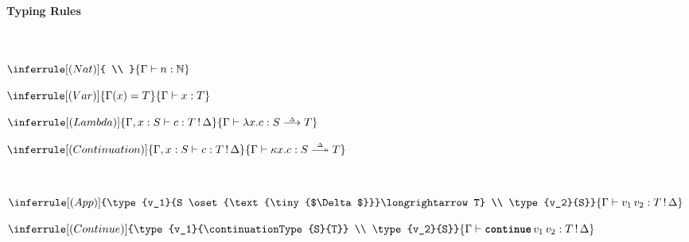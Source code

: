 \begin{figure}
  \begin{eff-desc}
    {\large\textbf{Typing Rules}}\\
    \vspace{2mm}\\
    \\
    \begin{center}
    \begin{minipage}[t]{0.2\textwidth}
      \centering
      $\inferrule[(Nat)]
      { \\ }
      {\type{n}{\mathbb{N}}}$
      \end{minipage}%
  \begin{minipage}[t]{0.2\textwidth}
    \centering
  $\inferrule[(Var)]
  {\Gamma(x) = T}
  {\type{x}{T}}$
  \end{minipage}%
  \begin{minipage}[t]{0.3\textwidth}
    \centering
  $\inferrule[(Lambda)]
    {\type[, x:S]{c}{\effectType{T}}}
    {\type{\function{x}{c}}{\functionType{S}{T}}}$
  \end{minipage}%
  \begin{minipage}[t]{0.3\textwidth}
  \centering
$\inferrule[(Continuation)]
  {\type[, x:S]{c}{\effectType{T}}}
  {\type{\continuation{x}{c}}{\continuationType{S}{T}}}$
\end{minipage}  
  \vspace{5mm}

\end{center}
  
  \\
  \begin{center}
    
  \begin{minipage}[t]{0.5\textwidth}
    \centering
  $\inferrule[(App)]
    {\type{v_1}{S \oset{\text{\tiny{$\Delta$}}}\longrightarrow T} \\ \type{v_2}{S}}
    {\type{v_1 \, v_2}{\effectType{T}}}$
  \end{minipage}%
  \begin{minipage}[t]{0.5\textwidth}
    \centering
  $\inferrule[(Continue)]
    {\type{v_1}{\continuationType{S}{T}} \\ \type{v_2}{S}}
    {\type{\continue{v_1}{v_2}}{\effectType{T}}}$
  \end{minipage}

  \vspace{5mm}


\end{center}
\end{eff-desc}
\end{figure}

